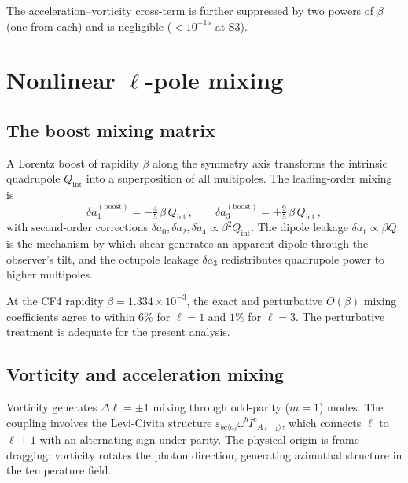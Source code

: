 The acceleration--vorticity cross-term is further
suppressed by two powers of $\beta$ (one from each) and is
negligible ($< 10^{-15}$ at S3).


\section{Nonlinear $\ell$-pole mixing}\label{sec:ell-mixing}

\subsection{The boost mixing matrix}\label{sec:boost-mix}

A Lorentz boost of rapidity $\beta$ along the symmetry axis
transforms the intrinsic quadrupole $Q_{\mathrm{int}}$ into a
superposition of all multipoles.  The leading-order mixing is
\begin{equation}\label{eq:ell-mixing}
\delta a_1^{(\mathrm{boost})}
= -\tfrac{4}{5}\,\beta\,Q_{\mathrm{int}}\,,\qquad
\delta a_3^{(\mathrm{boost})}
= +\tfrac{9}{5}\,\beta\,Q_{\mathrm{int}}\,,
\end{equation}
with second-order corrections
$\delta a_0, \delta a_2, \delta a_4 \propto \beta^2
Q_{\mathrm{int}}$.  The dipole leakage
$\delta a_1 \propto \beta Q$ is the mechanism by which shear
generates an apparent dipole through the observer's tilt, and
the octupole leakage $\delta a_3$ redistributes quadrupole
power to higher multipoles.

At the CF4 rapidity $\beta = 1.334 \times 10^{-3}$, the exact
and perturbative $O(\beta)$ mixing coefficients agree to within
$6\%$ for $\ell = 1$ and $1\%$ for $\ell = 3$.  The
perturbative treatment is adequate for the present analysis.


\subsection{Vorticity and acceleration mixing}
\label{sec:vort-accel-mix}

Vorticity generates $\Delta\ell = \pm 1$ mixing through
odd-parity ($m = 1$) modes.  The coupling involves the
Levi-Civita structure $\varepsilon_{bc\langle a_\ell}
\omega^b I^c{}_{A_{\ell-1}\rangle}$, which connects $\ell$ to
$\ell \pm 1$ with an alternating sign under parity.  The
physical origin is frame dragging: vorticity rotates the photon
direction, generating azimuthal structure in the temperature
field.

